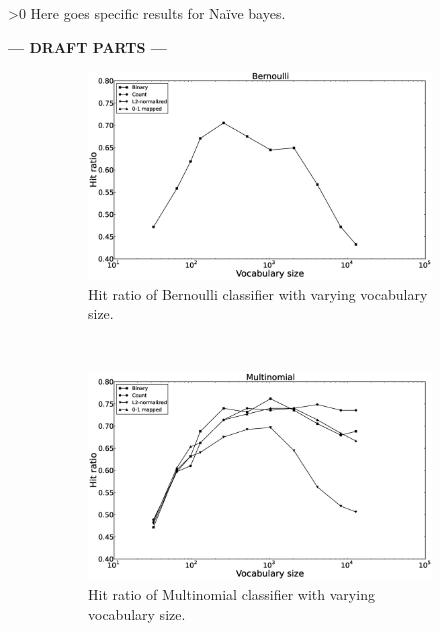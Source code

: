 \ifnum\printdraft>0
	Here goes specific results for Naïve bayes.
\else
\begin{center}
  	\textbf{--- DRAFT PARTS ---}
\end{center}
\fi
\newcommand{\figwidth}{0.45\textwidth}
\begin{figure}[H]
	\centering
	\begin{subfigure}[b]{\figwidth}
		\includegraphics[width=\textwidth]{Bernoulli-hitrate.eps}
		\caption{Hit ratio of Bernoulli classifier with varying vocabulary size.}
		\label{fig:hitrate-nb}
	\end{subfigure}
	~
	\begin{subfigure}[b]{\figwidth}
		\includegraphics[width=\textwidth]{Multinomial-hitrate.eps}
		\caption{Hit ratio of Multinomial classifier with varying vocabulary size.}
		\label{fig:hitrate-mn}
	\end{subfigure}
	\\
	\begin{subfigure}[b]{\figwidth}

\end{subfigure}
\end{figure}
